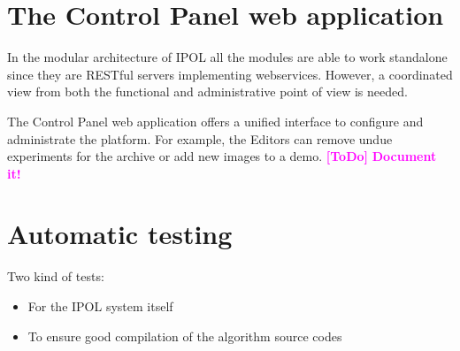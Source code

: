 \documentclass[a4paper,12pt]{article}
\newcommand{\ToDo}[1]{\textcolor{magenta}{\textbf{[ToDo]} \textbf{#1}}}
\begin{document}
\section{The Control Panel web application}
In the modular architecture of IPOL all the modules are able to work standalone since they are RESTful servers implementing webservices. However, a coordinated view from both the functional and administrative point of view is needed.

The Control Panel web application offers a unified interface to configure and administrate the platform. For example, the Editors can remove undue experiments for the archive or add new images to a demo.
\ToDo{Document it!}

\section{Automatic testing}
Two kind of tests:
\begin{itemize}
  \item For the IPOL system itself
  \item To ensure good compilation of the algorithm source codes
\end{itemize}



\end{document}
